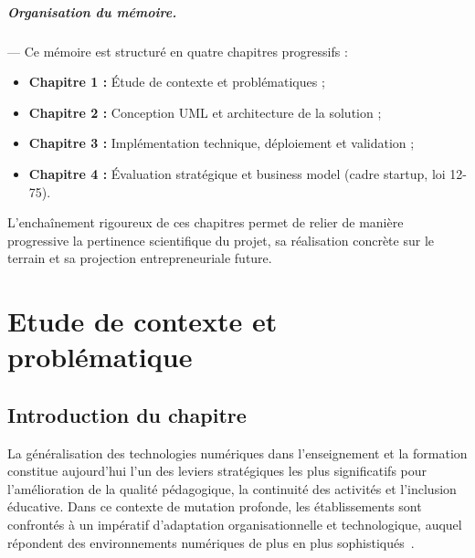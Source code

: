 \documentclass[12pt,a4paper,oneside]{report}
\begin{document}
\paragraph{Organisation du m\'emoire.} --- Ce m\'emoire est structur\'e en quatre chapitres progressifs :
\begin{itemize}
  \item \textbf{Chapitre 1 :} \'Etude de contexte et probl\'ematiques ;
  \item \textbf{Chapitre 2 :} Conception UML et architecture de la solution ;
  \item \textbf{Chapitre 3 :} Impl\'ementation technique, d\'eploiement et validation ;
  \item \textbf{Chapitre 4 :} \'Evaluation strat\'egique et business model (cadre startup, loi 12-75).
\end{itemize}

L’encha\^inement rigoureux de ces chapitres permet de relier de mani\`ere progressive la pertinence scientifique du projet, sa r\'ealisation concr\`ete sur le terrain et sa projection entrepreneuriale future.

\chapter{Etude de contexte et problématique}

\section{Introduction du chapitre}

La g\'en\'eralisation des technologies num\'eriques dans l'enseignement et la formation constitue aujourd'hui l'un des leviers strat\'egiques les plus significatifs pour l'am\'elioration de la qualit\'e p\'edagogique, la continuit\'e des activit\'es et l'inclusion \'educative. Dans ce contexte de mutation profonde, les établissements sont confrontés à un impératif d'adaptation organisationnelle et technologique, auquel répondent des environnements numériques de plus en plus sophistiqu\'es~\cite{unesco_digital_2026,worldbank_edtech_2026}.
\end{document}
